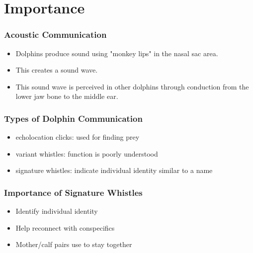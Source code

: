 \documentclass[12pt]{beamer}\usepackage[]{graphicx}\usepackage[]{color}
\begin{document}
\section{Importance}


\begin{frame}
\frametitle{Acoustic Communication}
\begin{itemize}
\item Dolphins produce sound using "monkey lips" in the nasal sac area.
\item This creates a sound wave.
\item This sound wave is perceived in other dolphins through conduction from the lower jaw bone to the middle ear.
\end{itemize}
\end{frame}

\begin{frame}
\frametitle{Types of Dolphin Communication}
\begin{itemize}
\item echolocation clicks: used for finding prey
\item variant whistles: function is poorly understood
\item signature whistles: indicate individual identity similar to a name
\end{itemize}
\end{frame}

\begin{frame}
\frametitle{Importance of Signature Whistles}
\begin{itemize}
\item<1-> Identify individual identity
\item<2-> Help reconnect with conspecifics
\item<3-> Mother/calf pairs use to stay together
\end{itemize}
\end{frame}
\end{document}
